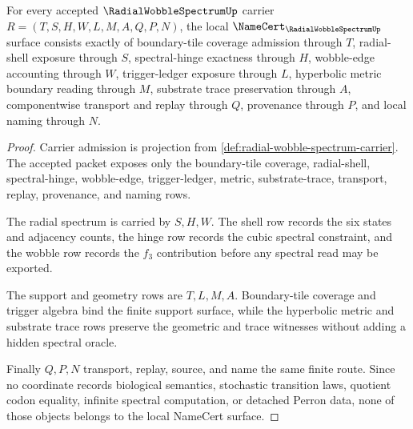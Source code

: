 \begin{theorem}
\label{thm:radial-wobble-spectrum-namecert-obligations}
For every accepted $\RadialWobbleSpectrumUp$ carrier $R=(T,S,H,W,L,M,A,Q,P,N)$, the local $\NameCert_{\RadialWobbleSpectrumUp}$ surface consists exactly of boundary-tile coverage admission through $T$, radial-shell exposure through $S$, spectral-hinge exactness through $H$, wobble-edge accounting through $W$, trigger-ledger exposure through $L$, hyperbolic metric boundary reading through $M$, substrate trace preservation through $A$, componentwise transport and replay through $Q$, provenance through $P$, and local naming through $N$.
\end{theorem}
\begin{proof}
Carrier admission is projection from \autoref{def:radial-wobble-spectrum-carrier}. The accepted packet exposes only the boundary-tile coverage, radial-shell, spectral-hinge, wobble-edge, trigger-ledger, metric, substrate-trace, transport, replay, provenance, and naming rows.

The radial spectrum is carried by $S,H,W$. The shell row records the six states and adjacency counts, the hinge row records the cubic spectral constraint, and the wobble row records the $f_{3}$ contribution before any spectral read may be exported.

The support and geometry rows are $T,L,M,A$. Boundary-tile coverage and trigger algebra bind the finite support surface, while the hyperbolic metric and substrate trace rows preserve the geometric and trace witnesses without adding a hidden spectral oracle.

Finally $Q,P,N$ transport, replay, source, and name the same finite route. Since no coordinate records biological semantics, stochastic transition laws, quotient codon equality, infinite spectral computation, or detached Perron data, none of those objects belongs to the local NameCert surface.
\end{proof}

